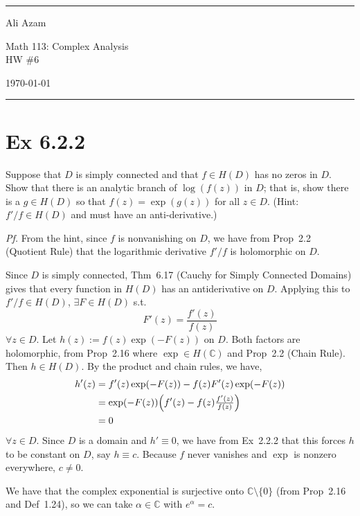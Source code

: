 \documentclass[a4paper]{article}
\begin{document}
\hrule\medskip
\begin{minipage}{0.295\textwidth}\raggedright\footnotesize
Ali Azam
\end{minipage}%
\begin{minipage}{0.4\textwidth}\centering
\large Math 113: Complex Analysis\\
\normalsize HW \#6
\end{minipage}%
\begin{minipage}{0.295\textwidth}\raggedleft
\today
\end{minipage}
\medskip\hrule\bigskip

\section*{Ex 6.2.2}

\begin{tcolorbox}[colback=gray!10, colframe=black, boxrule=0.5pt, arc=2mm]
Suppose that $D$ is simply connected and that $f\in H(D)$ has no zeros in $D$. Show that there is an analytic branch of $\log(f(z))$ in $D$; that is, show there is a $g\in H(D)$ so that $f(z)=\exp(g(z))$ for all $z\in D$. (Hint: $f'/f\in H(D)$ and must have an anti-derivative.)
\end{tcolorbox}

\textit{Pf.} From the hint, since $f$ is nonvanishing on $D$, we have from Prop~2.2 (Quotient Rule) that the logarithmic derivative $f'/f$ is holomorphic on $D$.

\medskip
Since $D$ is simply connected, Thm~6.17 (Cauchy for Simply Connected Domains) gives that every function in $H(D)$ has an antiderivative on $D$. Applying this to $f'/f\in H(D)$, $\exists F\in H(D)$ s.t.
\[
  F'(z)=\frac{f'(z)}{f(z)}
\]
$\forall z\in D$. Let $h(z):=f(z)\exp(-F(z))$ on $D$. Both factors are holomorphic, from Prop~2.16 where $\exp\in H(\mathbb{C})$ and Prop~2.2 (Chain Rule). Then $h\in H(D)$. By the product and chain rules, we have,
\begin{align*}
  h'(z) &=f'(z)\exp(-F(z))-f(z)F'(z)\exp(-F(z)) \\
  &=\exp(-F(z))\Bigl(f'(z)-f(z)\tfrac{f'(z)}{f(z)}\Bigr)\\
  &=0
\end{align*}
$\forall z\in D$. Since $D$ is a domain and $h'\equiv 0$, we have from Ex~2.2.2 that this forces $h$ to be constant on $D$, say $h\equiv c$. Because $f$ never vanishes and $\exp$ is nonzero everywhere, $c\ne 0$. 

\medskip
We have that the complex exponential is surjective onto $\mathbb{C}\setminus\{0\}$ (from Prop~2.16  and Def~1.24), so we can take $\alpha\in\mathbb{C}$ with $e^{\alpha}=c$.
\end{document}
